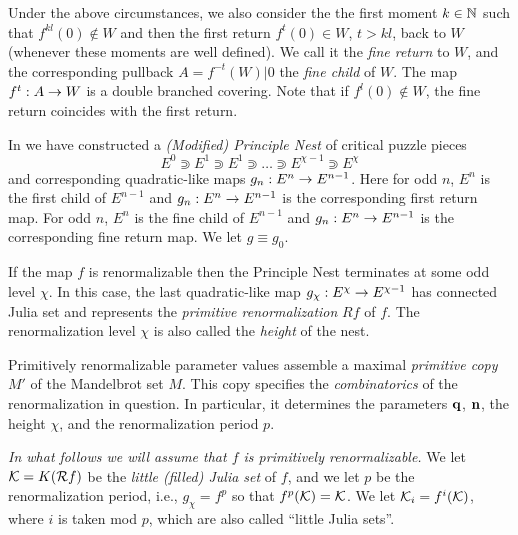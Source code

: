 Under the above circumstances,
we also consider the the first moment $k\in {\Bbb N}$ such that $f^{kl}(0)\not\in W$
and then the  first return $f^t(0)\in W$, $t>kl$, back to $W$ (whenever these moments are well defined).
We call it the {\it fine return} to $W$, and the corresponding pullback $A=f^{-t}(W)|0$ the {\it fine child} of $W$.
The map $f^t: A\rightarrow W$ is a double branched covering. Note that if  $f^l(0)\not\in W$,
the fine return coincides with the first return.


In \cite{KL-high} we have constructed a {\it (Modified) Principle Nest} of critical puzzle pieces
$$
  E^0\Supset E^1\Supset E^1\Supset\dots\Supset E^{\chi-1}\Supset E^\chi
$$
and corresponding quadratic-like maps $g_n: E^n\rightarrow E^{n-1}$. %
Here for odd $n$,  $E^n$ is the first child of $E^{n-1}$ and $g_n: E^n\rightarrow E^{n-1}$ is the corresponding  first return map.
For odd $n$, $E^n$ is the fine child of $E^{n-1}$ and $g_n: E^n\rightarrow E^{n-1}$ is the corresponding fine return map.
We let $g\equiv g_0$.

If the map $f$ is renormalizable then  the Principle Nest terminates at some odd level $\chi$.
In this case, the last quadratic-like map $g_\chi: E^\chi\rightarrow E^{\chi-1}$  has connected Julia set
and represents the {\it primitive renormalization} $Rf$ of $f$.
The renormalization level $\chi$ is also called the {\it height} of the nest.

Primitively renormalizable parameter values assemble a maximal {\it primitive copy} $M'$ of
the Mandelbrot set $M$. This copy specifies
the {\it combinatorics} of the renormalization in question.
In particular, it determines the parameters ${\mathbf{q}}$, ${\mathbf{n}}$, the height $\chi$,
and the renormalization period $p$.

{\it In what follows we will assume that $f$ is primitively renormalizable.}
We let ${\mathcal K}=K({\mathcal R} f)$ be the {\it little (filled) Julia set } of $f$,
and we let $p$ be the renormalization period, i.e., $g_\chi= f^p$ so that $f^p({\mathcal K})={\mathcal K}$.
We let ${\mathcal K}_i= f^i({\mathcal K})$, where $i$ is taken mod $p$, which are also called ``little Julia sets''.


